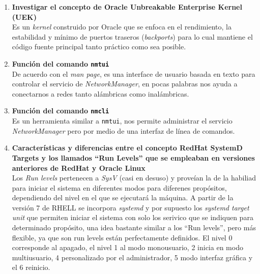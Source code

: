 \documentclass{article}
\begin{document}
\begin{enumerate}[label=\protect\textbf{\Alph*.}]
    \item \textbf{Investigar el concepto de Oracle Unbreakable Enterprise 
        Kernel (UEK)}\\
        Es un \textit{kernel} construido por Oracle que se enfoca en el 
        rendimiento, la estabilidad y mínimo de puertos traseros
        (\textit{backports}) para lo cual mantiene el código fuente principal 
        tanto práctico como sea posible.

    \item \textbf{Función del comando \texttt{nmtui}}\\
        De acuerdo con el \textit{man page}, es una interface de usuario basada
        en texto para controlar el servicio de \textit{NetworkManager}, en pocas
        palabras nos ayuda a conectarnos a redes tanto alámbricas como 
        inalámbricas.

    \item \textbf{Función del comando \texttt{nmcli}}\\
        Es un herramienta similar a \texttt{nmtui}, nos permite administrar el 
        servicio \textit{NetworkManager} pero por medio de una interfaz de línea
        de comandos.

    \item \textbf{Características y diferencias entre el concepto RedHat 
        SystemD Targets y los llamados “Run Levels” que se empleaban en 
        versiones anteriores de RedHat y Oracle Linux}\\
        Los \textit{Run levels} pertenecen a \textit{SysV} (casi en desuso) y
        proveían la de la habiliad para iniciar el sistema en diferentes modos 
        para diferenes propósitos, dependiendo del nivel en el que se ejecutará
        la máquina. A partir de la versión 7 de RHELL se incorpora 
        \textit{systemd} y por supuesto los \textit{systemd target unit} que
        permiten iniciar el sistema con solo los serivico que se indiquen para 
        determinado propósito, una idea bastante similar a los ``Run levels'',
        pero más flexible, ya que son run levels están perfectamente definidos.
        El nivel 0 corresponde al apagado, el nivel 1 al modo monousuario, 2 
        inicia en modo multiusuario, 4 personalizado por el administrador, 5
        modo interfaz gráfica y el 6 reinicio.


\end{enumerate}
\end{document}
